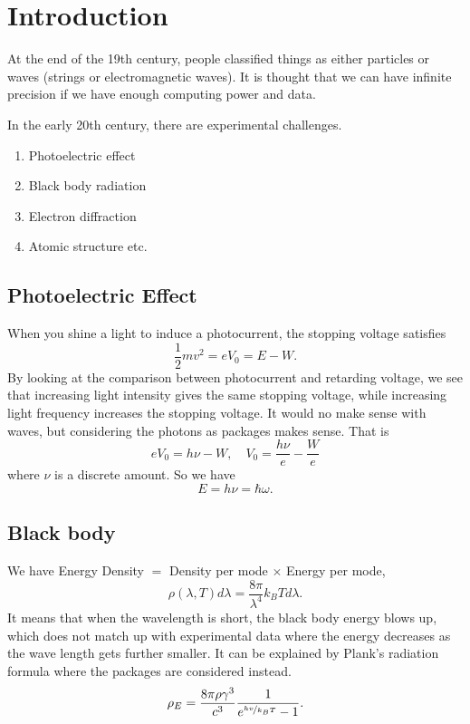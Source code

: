 \section*{Introduction}
At the end of the 19th century, people classified things as either particles or waves (strings or electromagnetic waves). It is thought that we can have infinite precision if we have enough computing power and data.

In the early 20th century, there are experimental challenges.
\begin{enumerate}
    \item Photoelectric effect
    \item Black body radiation
    \item Electron diffraction
    \item Atomic structure etc.
\end{enumerate}

\subsection{Photoelectric Effect}
When you shine a light to induce a photocurrent, the stopping voltage satisfies
\[
    \frac{1}{2}m v^2 = eV_0= E - W.
\]
By looking at the comparison between photocurrent and retarding voltage, we see that increasing light intensity gives the same stopping voltage, while increasing light frequency increases the stopping voltage. It would no make sense with waves, but considering the photons as packages makes sense. That is
\[
    eV_0 = h\nu - W,\quad V_0 = \frac{h\nu}{e} - \frac{W}{e}
\]
where \(\nu\) is a discrete amount. So we have
\[
    E = h\nu = \hbar \omega.
\]

\subsection{Black body}
We have Energy Density \(=\) Density per mode \(\times\) Energy per mode,
\[
    \rho(\lambda,T)d\lambda = \frac{8\pi}{\lambda^4}k_B Td\lambda.
\]
It means that when the wavelength is short, the black body energy blows up, which does not match up with experimental data where the energy decreases as the wave length gets further smaller. It can be explained by Plank's radiation formula where the packages are considered instead.
\[
    \rho_E = \frac{8\pi\rho \gamma^3}{c^3} \frac{1}{e^{\nicefrac{hv}{k_{B}T}} - 1}.
\]